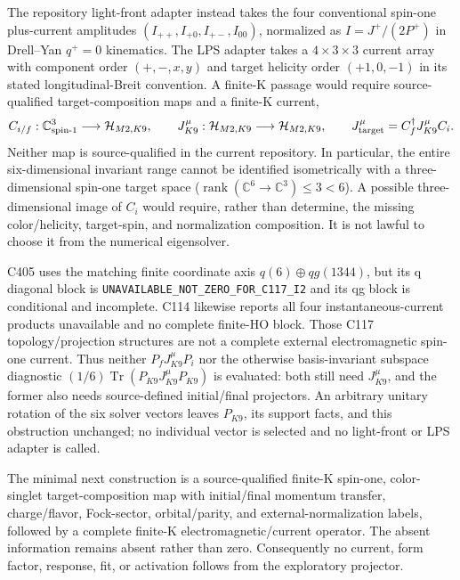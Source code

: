 \documentclass[11pt,oneside]{book}
\begin{document}
The repository light-front adapter instead takes the four conventional
spin-one plus-current amplitudes $(I_{++},I_{+0},I_{+-},I_{00})$, normalized
as $I=J^+/(2P^+)$ in Drell--Yan $q^+=0$ kinematics. The LPS adapter takes a
$4\times3\times3$ current array with component order $(+,-,x,y)$ and target
helicity order $(+1,0,-1)$ in its stated longitudinal-Breit convention. A
finite-K passage would require source-qualified target-composition maps and a
finite-K current,
\begin{equation}
 C_{i/f}:\mathbb C^3_{\rm spin\text{-}1}\longrightarrow\mathcal H_{M2,K9},
 \qquad J_{K9}^\mu:\mathcal H_{M2,K9}\longrightarrow\mathcal H_{M2,K9},
 \qquad J_{\rm target}^\mu=C_f^\dagger J_{K9}^\mu C_i.
 \label{eq:m2-target-current-map}
\end{equation}
Neither map is source-qualified in the current repository. In particular, the
entire six-dimensional invariant range cannot be identified isometrically
with a three-dimensional spin-one target space
($\operatorname{rank}(\mathbb C^6\to\mathbb C^3)\leq3<6$). A possible
three-dimensional image of $C_i$ would require, rather than determine, the
missing color/helicity, target-spin, and normalization composition. It is not
lawful to choose it from the numerical eigensolver.

C405 uses the matching finite coordinate axis $q(6)\oplus qg(1344)$, but its
q diagonal block is \texttt{UNAVAILABLE\_NOT\_ZERO\_FOR\_C117\_I2} and its
qg block is conditional and incomplete. C114 likewise reports all four
instantaneous-current products unavailable and no complete finite-HO block.
Those C117 topology/projection structures are not a complete external
electromagnetic spin-one current. Thus neither
$P_fJ_{K9}^\mu P_i$ nor the otherwise basis-invariant subspace diagnostic
$(1/6)\operatorname{Tr}(P_{K9}J_{K9}^\mu P_{K9})$ is evaluated: both still
need $J_{K9}^\mu$, and the former also needs source-defined initial/final
projectors. An arbitrary unitary rotation of the six solver vectors leaves
$P_{K9}$, its support facts, and this obstruction unchanged; no individual
vector is selected and no light-front or LPS adapter is called.

The minimal next construction is a source-qualified finite-K spin-one,
color-singlet target-composition map with initial/final momentum transfer,
charge/flavor, Fock-sector, orbital/parity, and external-normalization labels,
followed by a complete finite-K electromagnetic/current operator. The absent
information remains absent rather than zero. Consequently no current,
form factor, response, fit, or activation follows from the exploratory
projector.
\end{document}
